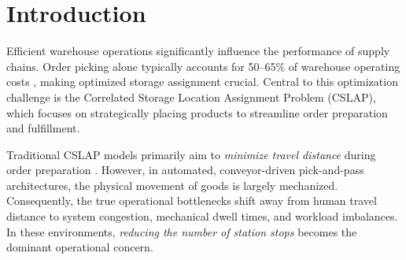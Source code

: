 \documentclass[preprint,review,11pt,authoryear]{elsarticle}
\begin{document}
\section{Introduction}

Efficient warehouse operations significantly influence the performance of supply chains. Order picking alone typically accounts for 50--65\% of warehouse operating costs \cite{xie2024combi}, making optimized storage assignment crucial. Central to this optimization challenge is the Correlated Storage Location Assignment Problem (CSLAP), which focuses on strategically placing products to streamline order preparation and fulfillment.

Traditional CSLAP models primarily aim to \emph{minimize travel distance} during order preparation \cite{islam2023}. However, in automated, conveyor-driven pick-and-pass architectures, the physical movement of goods is largely mechanized. Consequently, the true operational bottlenecks shift away from human travel distance to system congestion, mechanical dwell times, and workload imbalances. In these environments, \emph{reducing the number of station stops} becomes the dominant operational concern.
\end{document}
